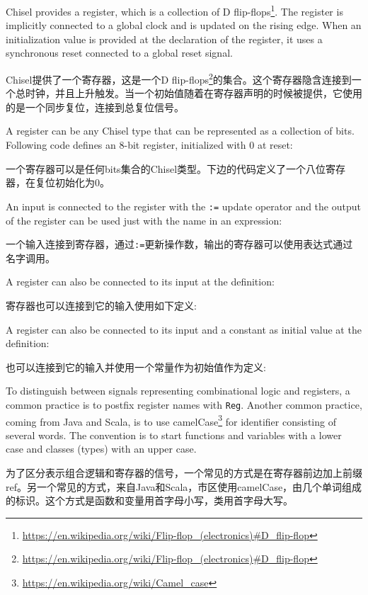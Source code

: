 \documentclass[%
    10pt,
    headinclude, footexclude,
    openright, %
    notitlepage,
    cleardoubleempty,
    headsepline,
    pointlessnumbers,
    bibtotoc, idxtotoc,
    ]{scrbook}
\newcommand{\code}[1]{{\small{\texttt{#1}}}}
\newcommand{\myref}[2]{\href{#1}{#2}}
\renewcommand{\myref}[2]{{#2}{\footnote{\url{#1}}}}
\begin{document}
Chisel provides a register, which is a collection of
\myref{https://en.wikipedia.org/wiki/Flip-flop\_(electronics)\#D\_flip-flop}{D flip-flops}.
The register is implicitly connected to a global clock and is updated on the rising edge.
When an initialization value is provided at the declaration of the register,
it uses a synchronous reset connected to a global reset signal.

Chisel提供了一个寄存器，这是一个\myref{https://en.wikipedia.org/wiki/Flip-flop\_(electronics)\#D\_flip-flop}{D flip-flops}的集合。这个寄存器隐含连接到一个总时钟，并且上升触发。当一个初始值随着在寄存器声明的时候被提供，它使用的是一个同步复位，连接到总复位信号。

A register can be any Chisel type that can be represented as a collection of bits.
Following code defines an 8-bit register, initialized with 0 at reset:

一个寄存器可以是任何bits集合的Chisel类型。下边的代码定义了一个八位寄存器，在复位初始化为0。



\noindent An input is connected to the register with the \code{:=} update operator and
the output of the register can be used just with the name in an expression:

一个输入连接到寄存器，通过\code{:=}更新操作数，输出的寄存器可以使用表达式通过名字调用。


\noindent A register can also be connected to its input at the definition:

寄存器也可以连接到它的输入使用如下定义: 


\noindent A register can also be connected to its input and a constant as
initial value at the definition:

也可以连接到它的输入并使用一个常量作为初始值作为定义:


\noindent To distinguish between signals representing combinational logic and registers,
a common practice is to postfix register names with \code{Reg}.
Another common practice, coming from Java and Scala, is to use
\myref{https://en.wikipedia.org/wiki/Camel_case}{camelCase} for
identifier consisting of several words. The convention is to start
functions and variables with a lower case and classes (types) with
an upper case.

为了区分表示组合逻辑和寄存器的信号，一个常见的方式是在寄存器前边加上前缀ref。另一个常见的方式，来自Java和Scala，市区使用camelCase，由几个单词组成的标识。这个方式是函数和变量用首字母小写，类用首字母大写。
\end{document}
